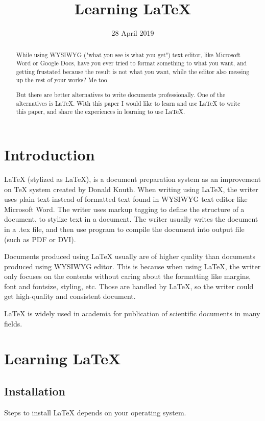 \documentclass[conference]{IEEEtran}
\title{Learning \LaTeX}
\author{
    \IEEEauthorblockN{Ridho Pratama}
    \IEEEauthorblockA{
        Teknik Informatika\\
        Sekolah Teknik Elektro dan Informatika\\
        Institut Teknologi Bandung\\
        Bandung, Indonesia\\
        Email: p.ridho@students.itb.ac.id\\
    }
}
\date{28 April 2019}
\begin{document}
\maketitle

\begin{abstract}
    While using WYSIWYG ("what you see is what you get") text editor,
    like Microsoft Word or Google Docs,
    have you ever tried to format something to what you want, and
    getting frustated because the result is not what you want, while the editor
    also messing up the rest of your works? Me too.

    But there are better alternatives to write documents professionally.
    One of the alternatives is \LaTeX.
    With this paper I would like to learn and use \LaTeX{} to write this paper,
    and share the experiences in learning to use \LaTeX.
\end{abstract}

\section{Introduction}
    LaTeX (stylized as \LaTeX), is a document preparation system as an improvement
    on TeX system created by Donald Knuth.
    When writing using LaTeX, the writer uses plain text instead of formatted text found in WYSIWYG text
    editor like Microsoft Word. The writer uses markup tagging to define the 
    structure of a document, to stylize text in a document.
    The writer usually writes the document in a .tex file, and then use program
    to compile the document into output file (such as PDF or DVI).

    Documents produced using LaTeX usually are of higher quality than documents
    produced using WYSIWYG editor.
    This is because when using LaTeX, the writer only focuses on the contents
    without caring about the formatting like margins, font and fontsize,
    styling, etc. Those are handled by LaTeX, so the writer could get high-quality
    and consistent document.

    LaTeX is widely used in academia for publication of scientific documents
    in many fields.

\section{Learning \LaTeX}
\subsection{Installation}
    Steps to install LaTeX depends on your operating system.
\end{document}
